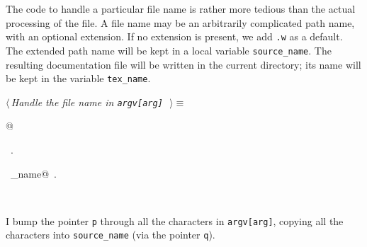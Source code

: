 \documentclass{report}
\begin{document}
\newpage
\noindent
The code to handle a particular file name is rather more tedious than
the actual processing of the file. A file name may be an arbitrarily
complicated path name, with an optional extension. If no extension is
present, we add \verb|.w| as a default. The extended path name will be
kept in a local variable \verb|source_name|. The resulting documentation
file will be written in the current directory; its name will be kept
in the variable \verb|tex_name|.
\begin{flushleft} \small
\begin{minipage}{\linewidth} \label{scrap28}
$\langle\,${\it Handle the file name in \verb|argv[arg]|}\nobreak\ {\footnotesize {}}$\,\rangle\equiv$
\vspace{-1ex}
\begin{list}{}{} \item
\mbox{}@{\NWsep}
\end{list}
\vspace{-1ex}
\footnotesize\addtolength{\baselineskip}{-1ex}
\begin{list}{}{\setlength{\itemsep}{-\parsep}\setlength{\itemindent}{-\leftmargin}}
\item \NWtxtMacroRefIn\ .
\end{list}
\vspace{-2ex}
\footnotesize\addtolength{\baselineskip}{-1ex}
\begin{list}{}{\setlength{\itemsep}{-\parsep}\setlength{\itemindent}{-\leftmargin}}
\item \NWtxtIdentsUsed\nobreak\  \verb@source_name@\nobreak\ .\end{list}
\end{minipage}\\[4ex]
\end{flushleft}
I bump the pointer \verb|p| through all the characters in \verb|argv[arg]|,
copying all the characters into \verb|source_name| (via the pointer
\verb|q|). 
\end{document}

